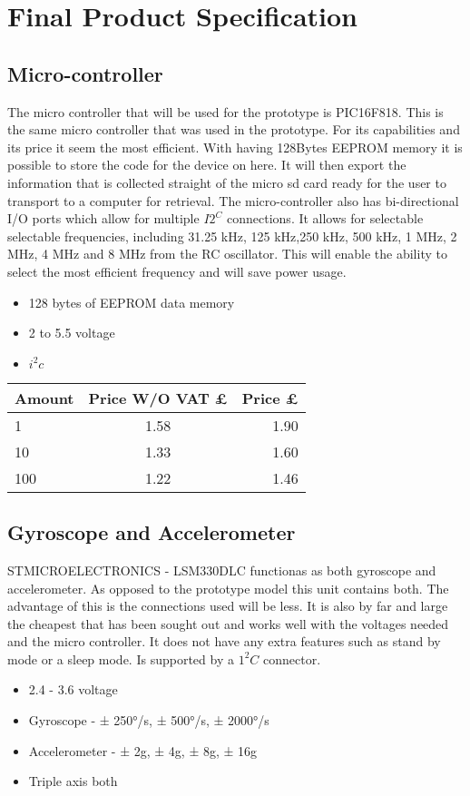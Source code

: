 \documentclass{report}
\begin{document}
\section{Final Product Specification}

\subsection{Micro-controller}
The micro controller that will be used for the prototype is PIC16F818. This is the same micro controller that was used in the prototype. For its capabilities and its price it seem the most efficient. With having 128Bytes EEPROM memory it is possible to store the code for the device on here. It will then export the information that is collected straight of the micro sd card ready for the user to transport to a computer for retrieval. The micro-controller also has bi-directional I/O ports which allow for multiple $I2^C$ connections. It allows for selectable selectable frequencies, including 31.25 kHz, 125 kHz,250 kHz, 500 kHz, 1 MHz, 2 MHz, 4 MHz and 8 MHz from the RC oscillator. This will enable the ability to select the most efficient frequency and will save power usage. 
\begin{itemize}
\item 128 bytes of EEPROM data memory
\item 2 to 5.5 voltage
\item $i^2c$
\end{itemize}
\begin{center}
  \begin{tabular}{ | l | c | r |}
    \hline
    Amount & Price W/O VAT £ & Price £ \\ \hline
    1 & 1.58 & 1.90 \\ \hline
    10 & 1.33 & 1.60 \\ \hline
    100 & 1.22 & 1.46   \\ \hline
  \end{tabular}
\end{center}

\subsection{Gyroscope and Accelerometer}
STMICROELECTRONICS - LSM330DLC functionas as both gyroscope and accelerometer. As opposed to the prototype model this unit contains both. The advantage of this is the connections used will be less. It is also by far and large the cheapest that has been sought out and works well with the voltages needed and the micro controller. It does not have any extra features such as stand by mode or a sleep mode. Is supported by a $1^2C$ connector. 
\begin{itemize}
\item 2.4 - 3.6 voltage 
\item Gyroscope -  ± 250°/s, ± 500°/s, ± 2000°/s
\item Accelerometer - ± 2g, ± 4g, ± 8g, ± 16g
\item Triple axis both
\end{itemize}
\end{document}
